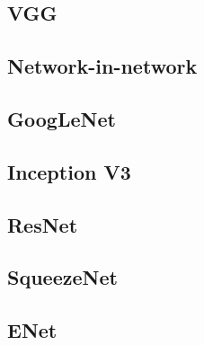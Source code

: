 \subsection{VGG} %
\label{vgg}

\subsection{Network-in-network}
\label{nin}

\subsection{GoogLeNet}
\label{googlenet}

\subsection{Inception V3}
\label{inception}

\subsection{ResNet} %
\label{resnet}

\subsection{SqueezeNet}
\label{squeezenet}

\subsection{ENet}
\label{enet}